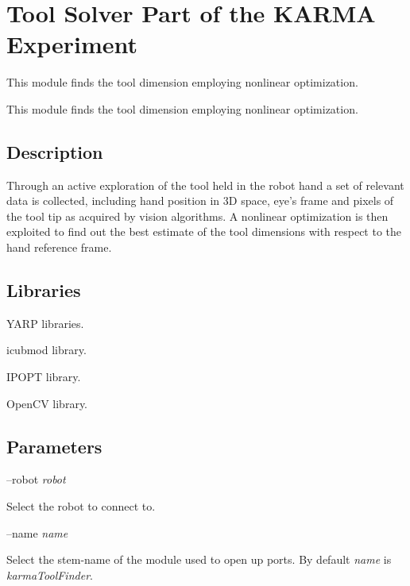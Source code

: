 \section{Tool Solver Part of the K\+A\+R\+M\+A Experiment}
\label{group__karmaToolFinder}


This module finds the tool dimension employing nonlinear optimization.  


This module finds the tool dimension employing nonlinear optimization. 

\hypertarget{group__karmaToolProjection_intro_sec}{}\subsection{Description}\label{group__karmaToolProjection_intro_sec}
Through an active exploration of the tool held in the robot hand a set of relevant data is collected, including hand position in 3\+D space, eye's frame and pixels of the tool tip as acquired by vision algorithms. A nonlinear optimization is then exploited to find out the best estimate of the tool dimensions with respect to the hand reference frame.\hypertarget{group__karmaToolProjection_lib_sec}{}\subsection{Libraries}\label{group__karmaToolProjection_lib_sec}

\begin{DoxyItemize}
\item Y\+A\+R\+P libraries.
\item icubmod library.
\item I\+P\+O\+P\+T library.
\item Open\+C\+V library.
\end{DoxyItemize}\hypertarget{group__karmaToolProjection_parameters_sec}{}\subsection{Parameters}\label{group__karmaToolProjection_parameters_sec}
--robot {\itshape robot} 
\begin{DoxyItemize}
\item Select the robot to connect to.
\end{DoxyItemize}

--name {\itshape name} 
\begin{DoxyItemize}
\item Select the stem-\/name of the module used to open up ports. By default {\itshape name} is {\itshape karma\+Tool\+Finder}.
\end{DoxyItemize}


